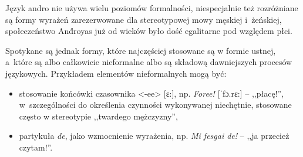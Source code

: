 \begin{spacing}{1.1}
Język andro nie używa wielu poziomów formalności, niespecjalnie też rozróżniane
są formy wyrażeń zarezerwowane dla stereotypowej mowy męskiej i~żeńskiej,
społeczeństwo And́royas już od wieków było dość egalitarne pod względem płci.

Spotykane są jednak formy, które najczęściej stosowane są w formie ustnej,
a~które są albo całkowicie nieformalne albo są składową dawniejszych procesów
językowych. Przykładem elementów nieformalnych mogą być:

\begin{itemize}
	\item stosowanie końcówki czasownika <-ee> [ɛ:], np. \emph{Foree!} [ˈfɔ.rɛ:]
	-- ,,płacę!'', w~szczególności do określenia czynności wykonywanej
	niechętnie, stosowane często w stereotypie ,,twardego mężczyzny'',
	\item partykuła \emph{de}, jako wzmocnienie wyrażenia, np. \emph{Mi fesgai
	de!} -- ,,ja przecież czytam!''.
\end{itemize}

\end{spacing}